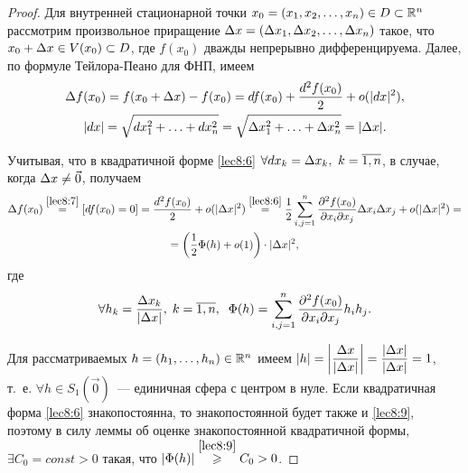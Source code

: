 \documentclass[../../main.tex]{subfiles}
\begin{document}
    \begin{proof}
        Для внутренней стационарной точки $x_0 = (x_1, x_2, \ldots, x_n)
        \in D \subset \R^n$ рассмотрим произвольное приращение $\D x =
        (\D x_1, \D x_2, \ldots, \D x_n)$ такое, что $x_0 + \D x \in V(x_0)
        \subset D$, где $f(x_0)$ дважды непрерывно дифференцируема. Далее, по
        формуле Тейлора-Пеано для ФНП, имеем
        \begin{equation}
            \begin{gathered}
                \D f(x_0) = f(x_0 + \D x) - f(x_0) = df(x_0) +
                \frac{d^2f(x_0)}2 + o(|dx|^2), \\|dx| = \sqrt{dx_1^2 + \ldots
                + dx_n^2} = \sqrt{\D x_1^2 + \ldots + \D x_n^2} = |\D x|.
            \end{gathered}
            \label{lec8:7}
        \end{equation}

        Учитывая, что в квадратичной форме \eqref{lec8:6} $\forall dx_k = \D
        x_k,\ k = \overline{1, n}$, в случае, когда $\D x \ne
        \vec{0}$, получаем
        \begin{equation}
            \begin{gathered}
                \D f(x_0) \stackrel{\eqref{lec8:7}}{=} [df(x_0) = 0] =
                \frac{d^2f(x_0)}2 + o(|\D x|^2) \stackrel{\eqref{lec8:6}}{=}
                \frac12 \sum_{i, j = 1}^n\pderiv{^2f(x_0)}{x_i\partial x_j}\D
                x_i \D x_j+ o(|\D x|^2) = \\ =\left(\frac12 \Phi(h) +
                o(1)\right) \cdot |\D x|^2,
            \end{gathered}
            \label{lec8:8}
        \end{equation}
        где
        \begin{equation}
            \forall h_k = \frac{\D x_k}{|\D x|}, \; k = \overline{1,n}, \;\;
            \Phi(h) =
                \sum_{i, j = 1}^n\pderiv{^2f(x_0)}{x_i\partial x_j}h_ih_j.
        \label{lec8:9}
        \end{equation}

        Для рассматриваемых $h = (h_1, \ldots, h_n) \in \R^n$ имеем
        $|h| = \left|\dfrac{\D x}{|\D x|}\right| = \dfrac{|\D x|}{|\D x|} = 1$,
        т.~е. $\forall h \in S_1(\vec{0})$~--- единичная сфера с
        центром в нуле. Если квадратичная форма \eqref{lec8:6} знакопостоянна,
        то знакопостоянной будет также и \eqref{lec8:9}, поэтому в силу леммы
        об оценке знакопостоянной квадратичной формы, $\exists C_0 = const >
        0$ такая, что $|\Phi(h)| \stackrel{\eqref{lec8:9}}{\geq} C_0 > 0$.


\end{proof}
\end{document}
